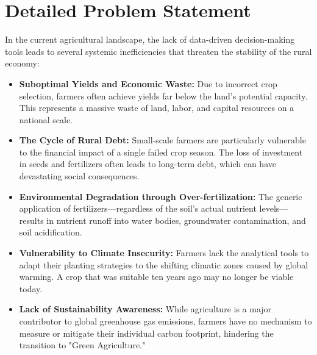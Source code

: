 \documentclass[12pt,a4paper]{report}
\begin{document}
\section{Detailed Problem Statement}
In the current agricultural landscape, the lack of data-driven decision-making tools leads to several systemic inefficiencies that threaten the stability of the rural economy:
\begin{itemize}
    \item \textbf{Suboptimal Yields and Economic Waste:} Due to incorrect crop selection, farmers often achieve yields far below the land's potential capacity. This represents a massive waste of land, labor, and capital resources on a national scale.
    \item \textbf{The Cycle of Rural Debt:} Small-scale farmers are particularly vulnerable to the financial impact of a single failed crop season. The loss of investment in seeds and fertilizers often leads to long-term debt, which can have devastating social consequences.
    \item \textbf{Environmental Degradation through Over-fertilization:} The generic application of fertilizers—regardless of the soil's actual nutrient levels—results in nutrient runoff into water bodies, groundwater contamination, and soil acidification.
    \item \textbf{Vulnerability to Climate Insecurity:} Farmers lack the analytical tools to adapt their planting strategies to the shifting climatic zones caused by global warming. A crop that was suitable ten years ago may no longer be viable today.
    \item \textbf{Lack of Sustainability Awareness:} While agriculture is a major contributor to global greenhouse gas emissions, farmers have no mechanism to measure or mitigate their individual carbon footprint, hindering the transition to "Green Agriculture."
\end{itemize}
\end{document}
